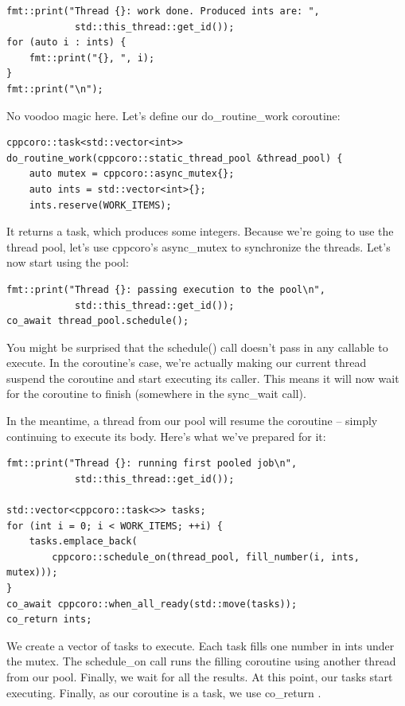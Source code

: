 \begin{lstlisting}[style=styleCXX]
fmt::print("Thread {}: work done. Produced ints are: ",
			std::this_thread::get_id());
for (auto i : ints) {
	fmt::print("{}, ", i);
}
fmt::print("\n");
\end{lstlisting}

No voodoo magic here. Let's define our do\_routine\_work coroutine:

\begin{lstlisting}[style=styleCXX]
cppcoro::task<std::vector<int>>
do_routine_work(cppcoro::static_thread_pool &thread_pool) {
	auto mutex = cppcoro::async_mutex{};
	auto ints = std::vector<int>{};
	ints.reserve(WORK_ITEMS);
\end{lstlisting}

It returns a task, which produces some integers. Because we're going to use the thread pool, let's use cppcoro's async\_mutex to synchronize the threads. Let's now start using the pool:

\begin{lstlisting}[style=styleCXX]
fmt::print("Thread {}: passing execution to the pool\n",
			std::this_thread::get_id());
co_await thread_pool.schedule();
\end{lstlisting}

You might be surprised that the schedule() call doesn't pass in any callable to execute. In the coroutine's case, we're actually making our current thread suspend the coroutine and start executing its caller. This means it will now wait for the coroutine to finish (somewhere in the sync\_wait call).

In the meantime, a thread from our pool will resume the coroutine – simply continuing to execute its body. Here's what we've prepared for it:

\begin{lstlisting}[style=styleCXX]
fmt::print("Thread {}: running first pooled job\n",
			std::this_thread::get_id());
			
std::vector<cppcoro::task<>> tasks;
for (int i = 0; i < WORK_ITEMS; ++i) {
	tasks.emplace_back(
		cppcoro::schedule_on(thread_pool, fill_number(i, ints, mutex)));
}
co_await cppcoro::when_all_ready(std::move(tasks));
co_return ints;
\end{lstlisting}

We create a vector of tasks to execute. Each task fills one number in ints under the mutex. The schedule\_on call runs the filling coroutine using another thread from our pool. Finally, we wait for all the results. At this point, our tasks start executing. Finally, as our coroutine is a task, we use co\_return .

